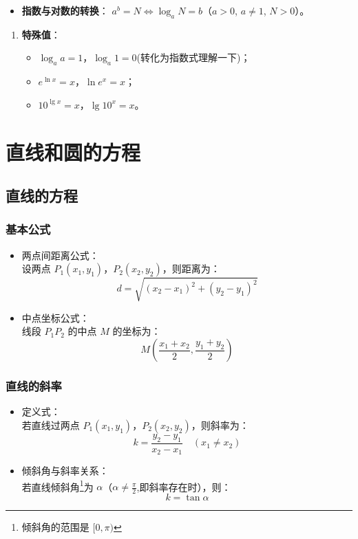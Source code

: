\documentclass{article}
\begin{document}
\begin{itemize}
    \item \textbf{指数与对数的转换}：
    \( a^b = N \iff \log_a N = b \)（\( a > 0 \), \( a \neq 1 \), \( N > 0 \)）。
\end{itemize}

\begin{enumerate}
    \item \textbf{特殊值}：
    \begin{itemize}
        \item \( \log_a a = 1 \)，\( \log_a 1 = 0 \)(转化为指数式理解一下)；
        \item \( e^{\ln x} = x \)，\( \ln e^x = x \)；
        \item \( 10^{\lg x} = x \)，\( \lg 10^x = x \)。
    \end{itemize}
\end{enumerate}

\section{直线和圆的方程}
\subsection{直线的方程}
\subsubsection{基本公式}
\begin{itemize}
    \item 两点间距离公式：\\
          设两点 \( P_1(x_1, y_1) \)，\( P_2(x_2, y_2) \)，则距离为：
          \[
          d = \sqrt{(x_2 - x_1)^2 + (y_2 - y_1)^2}
          \]
    \item 中点坐标公式：\\
          线段 \( P_1P_2 \) 的中点 \( M \) 的坐标为：
          \[
          M\left( \frac{x_1 + x_2}{2}, \frac{y_1 + y_2}{2} \right)
          \]
\end{itemize}

\subsubsection{直线的斜率}
\begin{itemize}
    \item 定义式：\\
          若直线过两点 \( P_1(x_1, y_1) \)，\( P_2(x_2, y_2) \)，则斜率为：
          \[
          k = \frac{y_2 - y_1}{x_2 - x_1} \quad (x_1 \neq x_2)
          \]
          
    \item 倾斜角与斜率关系：\\
          若直线倾斜角\footnote{倾斜角的范围是 $[0,\pi)$}为 \( \alpha \)（\( \alpha \neq \frac{\pi}{2}  \),即斜率存在时），则：
          \[
          k = \tan \alpha
          \]
\end{itemize}
\end{document}
